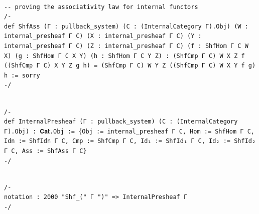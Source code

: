 \documentclass{book}
\theoremstyle{definition}
\newcounter{lcounter}
\begin{document}
\begin{center}
\begin{tcolorbox}[width=5in,colback={white},title={\begin{center}\texttt{Lean \thelcounter} \addtocounter{lcounter}{1}  \end{center}},colbacktitle=Blue,coltitle=black]
\begin{verbatim}

-- proving the associativity law for internal functors
/-
def ShfAss (Γ : pullback_system) (C : (InternalCategory Γ).Obj) (W : internal_presheaf Γ C) (X : internal_presheaf Γ C) (Y : internal_presheaf Γ C) (Z : internal_presheaf Γ C) (f : ShfHom Γ C W X) (g : ShfHom Γ C X Y) (h : ShfHom Γ C Y Z) : (ShfCmp Γ C) W X Z f ((ShfCmp Γ C) X Y Z g h) = (ShfCmp Γ C) W Y Z ((ShfCmp Γ C) W X Y f g) h := sorry
-/

\end{verbatim}
\end{tcolorbox}
\end{center}

\begin{center}
\begin{tcolorbox}[width=5in,colback={white},title={\begin{center}\texttt{Lean \thelcounter} \addtocounter{lcounter}{1}  \end{center}},colbacktitle=Blue,coltitle=black]
\begin{verbatim}

/-
def InternalPresheaf (Γ : pullback_system) (C : (InternalCategory Γ).Obj) : 𝐂𝐚𝐭.Obj := {Obj := internal_presheaf Γ C, Hom := ShfHom Γ C, Idn := ShfIdn Γ C, Cmp := ShfCmp Γ C, Id₁ := ShfId₁ Γ C, Id₂ := ShfId₂ Γ C, Ass := ShfAss Γ C}
-/

\end{verbatim}
\end{tcolorbox}
\end{center}

\begin{center}
\begin{tcolorbox}[width=5in,colback={white},title={\begin{center}\texttt{Lean \thelcounter} \addtocounter{lcounter}{1}  \end{center}},colbacktitle=Blue,coltitle=black]
\begin{verbatim}

/-
notation : 2000 "Shf_(" Γ ")" => InternalPresheaf Γ
-/

\end{verbatim}
\end{tcolorbox}
\end{center}
\end{document}
